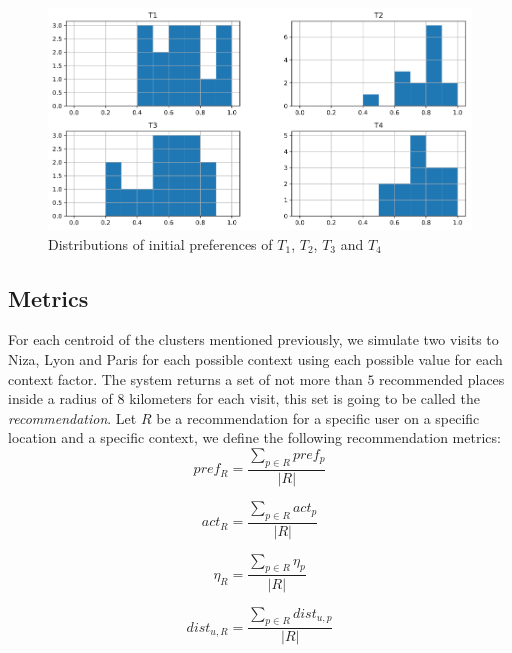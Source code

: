 \begin{figure}[h]
    \centering
    \includegraphics[scale=0.25]{tourist_histogram.png}
    \caption{Distributions of initial preferences of $T_1$, $T_2$, $T_3$ and $T_4$}
    \label{fig:tourist_hist} 
\end{figure}

\subsection{Metrics} \label{section:metrics}
For each centroid of the clusters mentioned previously, we simulate two visits to Niza, Lyon and Paris for each possible context using each possible value for each context factor. The system returns a set of not more than $5$ recommended places inside a radius of $8$ kilometers for each visit, this set is going to be called the \textit{recommendation}. Let $R$ be a recommendation for a specific user on a specific location and a specific context, we define the following recommendation metrics:
\begin{equation}
    pref_{R} = \frac{ \displaystyle \sum_{p \in R}{pref_p} }{| R |}
\end{equation}

\begin{equation}
    act_{R} = \frac{ \displaystyle \sum_{p \in R}{act_p} }{| R |}
\end{equation}

\begin{equation}
    \eta_{R} = \frac{ \displaystyle \sum_{p \in R}{\eta_p} }{| R |}
\end{equation}

\begin{equation}
    dist_{u, R} = \frac{ \displaystyle \sum_{p \in R}{dist_{u, p}} }{| R |}
\end{equation}

